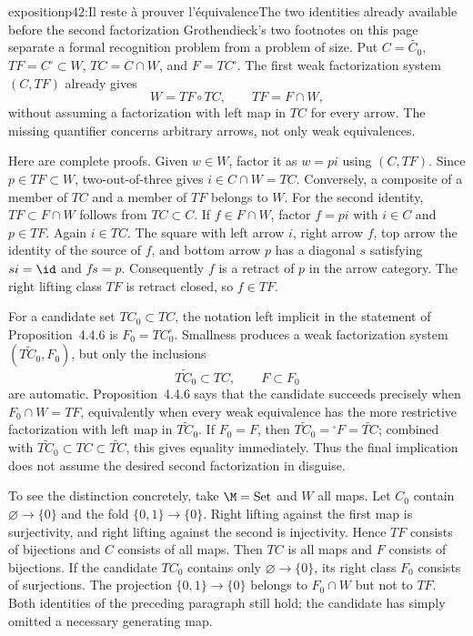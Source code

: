 \begin{dcomment}{exposition}{p42:Il reste à prouver l'équivalence}{The two identities already available before the second factorization}
Grothendieck's two footnotes on this page separate a formal recognition problem from a problem of size. Put $C=\widetilde{C_0}$, $TF=C^{\square}\subset W$, $TC=C\cap W$, and $F=TC^{\square}$. The first weak factorization system $(C,TF)$ already gives
\[
W=TF\circ TC,\qquad TF=F\cap W,
\]
without assuming a factorization with left map in $TC$ for every arrow. The missing quantifier concerns arbitrary arrows, not only weak equivalences.

Here are complete proofs. Given $w\in W$, factor it as $w=pi$ using $(C,TF)$. Since $p\in TF\subset W$, two-out-of-three gives $i\in C\cap W=TC$. Conversely, a composite of a member of $TC$ and a member of $TF$ belongs to $W$. For the second identity, $TF\subset F\cap W$ follows from $TC\subset C$. If $f\in F\cap W$, factor $f=pi$ with $i\in C$ and $p\in TF$. Again $i\in TC$. The square with left arrow $i$, right arrow $f$, top arrow the identity of the source of $f$, and bottom arrow $p$ has a diagonal $s$ satisfying $si=\id$ and $fs=p$. Consequently $f$ is a retract of $p$ in the arrow category. The right lifting class $TF$ is retract closed, so $f\in TF$.

For a candidate set $TC_0\subset TC$, the notation left implicit in the statement of Proposition~4.4.6 is $F_0=TC_0^{\square}$. Smallness produces a weak factorization system $(\widetilde{TC_0},F_0)$, but only the inclusions
\[
\widetilde{TC_0}\subset TC,\qquad F\subset F_0
\]
are automatic. Proposition~4.4.6 says that the candidate succeeds precisely when $F_0\cap W=TF$, equivalently when every weak equivalence has the more restrictive factorization with left map in $\widetilde{TC_0}$. If $F_0=F$, then $\widetilde{TC_0}={}^{\square}F=\widetilde{TC}$; combined with $\widetilde{TC_0}\subset TC\subset\widetilde{TC}$, this gives equality immediately. Thus the final implication does not assume the desired second factorization in disguise.

To see the distinction concretely, take $\M=\mathrm{Set}$ and $W$ all maps. Let $C_0$ contain $\varnothing\to\{0\}$ and the fold $\{0,1\}\to\{0\}$. Right lifting against the first map is surjectivity, and right lifting against the second is injectivity. Hence $TF$ consists of bijections and $C$ consists of all maps. Then $TC$ is all maps and $F$ consists of bijections. If the candidate $TC_0$ contains only $\varnothing\to\{0\}$, its right class $F_0$ consists of surjections. The projection $\{0,1\}\to\{0\}$ belongs to $F_0\cap W$ but not to $TF$. Both identities of the preceding paragraph still hold; the candidate has simply omitted a necessary generating map.
\end{dcomment}

